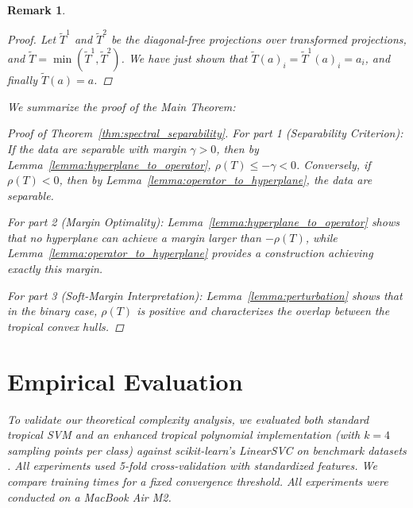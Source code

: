\documentclass{article}
\newtheorem{remark}{Remark}
\begin{document}
\begin{remark}
\begin{proof}
Let $\tilde{T}^{1}$ and $\tilde{T}^{2}$ be the diagonal-free projections
over transformed projections, and $\tilde{T}=\min(\tilde{T}^{1},\tilde{T}^{2})$.
We have just shown that $\tilde{T}(a)_{i}=\tilde{T}^{1}(a)_{i}=a_{i}$,
and finally $\tilde{T}(a)=a$.
\end{proof}

We summarize the proof of the Main Theorem:

\begin{proof}[Proof of Theorem~\ref{thm:spectral_separability}]
For part 1 (Separability Criterion): If the data are separable with margin $\gamma > 0$, then by Lemma~\ref{lemma:hyperplane_to_operator}, $\rho(T) \leq -\gamma < 0$. Conversely, if $\rho(T) < 0$, then by Lemma~\ref{lemma:operator_to_hyperplane}, the data are separable.

For part 2 (Margin Optimality): Lemma~\ref{lemma:hyperplane_to_operator} shows that no hyperplane can achieve a margin larger than $-\rho(T)$, while Lemma~\ref{lemma:operator_to_hyperplane} provides a construction achieving exactly this margin.

For part 3 (Soft-Margin Interpretation): Lemma~\ref{lemma:perturbation} shows that in the binary case, $\rho(T)$ is positive and characterizes the overlap between the tropical convex hulls.
\end{proof}

\section{Empirical Evaluation}\label{appendix:empirical}

To validate our theoretical complexity analysis, we evaluated both standard tropical SVM and an enhanced tropical polynomial implementation (with $k=4$ sampling points per class) against scikit-learn's LinearSVC on benchmark datasets \cite{scikit-learn,waveform_database_generator_(version_1)_107}. All experiments used 5-fold cross-validation with standardized features. We compare training times for a fixed convergence threshold. All experiments were conducted on a MacBook Air M2.


\end{remark}
\end{document}
